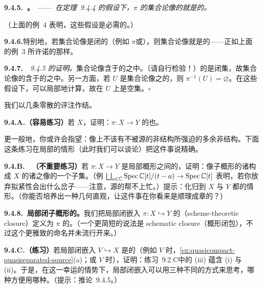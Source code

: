 \textbf{9.4.5.\ \trhCorollary{}。}\ ——\ \emph{在定理~9.4.4 的假设下，$\pi$ 的集合论像的\trClosure{}就是\trSchemeTheoreticImage{}的\trUnderlyingSet。}

（上面的例~4 表明，这些假设是必需的。）

\textbf{9.4.6.}\quad 特别地，若集合论像是闭的（例如 $\pi$\trFinite{}或\trProjective），则集合论像就是\trSchemeTheoreticImage{}的\trUnderlyingSet——正如上面的例~3 所许诺的那样。

\textbf{9.4.7.}\ \emph{\trhCorollary{}~9.4.5 的证明。}\quad 集合论像含于\trSchemeTheoreticImage{}的\trUnderlyingSet{}之中。（请自行检验！）\trSchemeTheoreticImage{}的\trUnderlyingSet{}是闭集，故集合论像的\trClosure{}含于\trSchemeTheoreticImage{}的\trUnderlyingSet{}之中。另一方面，若 $U$ 是集合论像之\trClosure{}的\trComplement，则 $\pi^{-1}(U)=\varnothing$。在这些假设下，\trSchemeTheoreticImage{}可以局部地计算，故在 $U$ 上\trSchemeTheoreticImage{}是空集。\hfill$\square$

我们以几条零散的评注作结。

\textbf{9.4.A.（容易练习）}\quad 若 $X$\trReduced，证明：$\pi\colon X\to Y$ 的\trSchemeTheoreticImage{}也\trReduced。

更一般地，你或许会指望：像上不该有不被源的非\trReduced{}结构所强迫的多余非\trReduced{}结构。下面这条练习在局部\trNoetherian{}的情形（此时我们可以谈论\trAssociatedPoint）把这件事说精确。

\textbf{9.4.B.}\ \hard\ \textbf{（不重要练习）}\quad 若 $\pi\colon X\to Y$ 是局部\trNoetherian{}概形之间的\trQuasicompact\trMorphism，证明：像子概形的诸\trAssociatedPoint{}构成 $X$ 的诸\trAssociatedPoint{}之像的一个子集。（例 $\bigsqcup_{a\in\mathbb{C}}\operatorname{Spec}\mathbb{C}[t]/(t-a)\to\operatorname{Spec}\mathbb{C}[t]$ 表明，若你放弃拟紧性会出什么岔子——注意，源的\trReducedness{}帮不上忙。）提示：化归到 $X$ 与 $Y$ 都\trAffine{}的情形。（你能否培养出一种几何直观，让这件事在你看来是顺理成章的？）

\textbf{9.4.8.\ 局部闭子概形的\trSchemeTheoretic\trClosure。}\quad 我们把局部闭嵌入 $\pi\colon X\hookrightarrow Y$ 的\textbf{\trSchemeTheoretic\trClosure{}}（scheme-theoretic closure）定义为 $\pi$ 的\trSchemeTheoreticImage{}。（一个更简短的说法是 schematic closure（概形闭包），不过这个更雅致的命名并未流行开来。）

\textbf{9.4.C.（练习）}\quad 若局部闭嵌入 $V\hookrightarrow X$ 是\trQuasicompact{}的（例如 $V$ \trNoetherian{}时，\cref{ex:quasicompact-quasiseparated-source}(a)；或 $V$ \trReduced{}时），证明：\mbox{练习~9.2.C}中的 (iii) 蕴含 (i) 与 (ii)。于是，在这一幸运的情势下，局部闭嵌入可以用三种不同的方式来思考，哪种方便用哪种。（提示：推论~9.4.5。）

